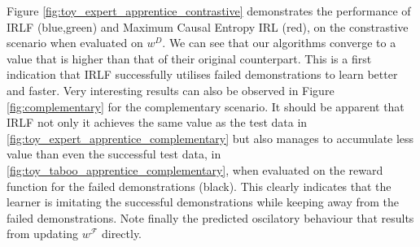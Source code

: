 \documentclass[letterpaper]{article}
\begin{document}
Figure \ref{fig:toy_expert_apprentice_contrastive} demonstrates the performance of IRLF (blue,green) and Maximum Causal Entropy IRL (red), on the constrastive scenario when evaluated on $w^{D}$. We can see that our algorithms
converge to a value that is higher than that of their original counterpart. This is a first indication that IRLF successfully utilises failed demonstrations to learn better and faster. Very interesting results can also be observed in Figure \ref{fig:complementary} for the complementary scenario. It should be apparent that IRLF not only it achieves the same value as the test data in \ref{fig:toy_expert_apprentice_complementary} but also manages to accumulate less value than even the successful test data, in \ref{fig:toy_taboo_apprentice_complementary}, when evaluated on the reward function for the failed demonstrations (black). This clearly indicates that the learner is imitating the successful demonstrations while keeping away from the failed demonstrations. Note finally the predicted oscilatory behaviour that results from updating $w^\mathcal{F}$ directly.

\end{document}
